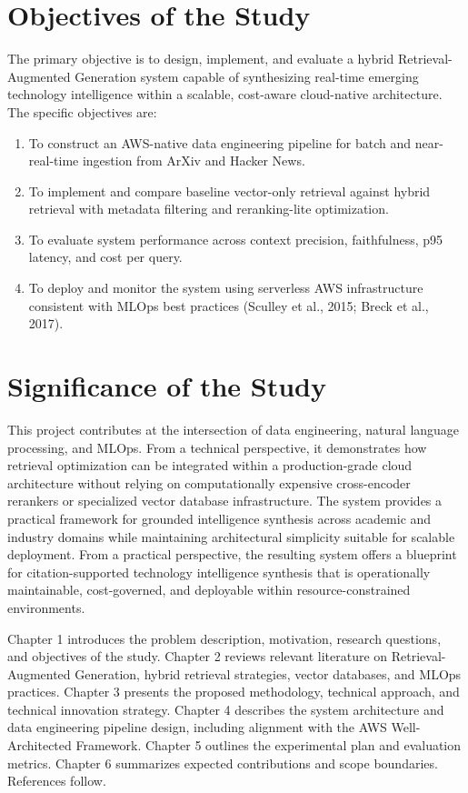 \documentclass[12pt,a4paper]{report}
\begin{document}
\section{Objectives of the Study}
\label{sec:objectives}

The primary objective is to design, implement, and evaluate a hybrid Retrieval-Augmented Generation system capable of synthesizing real-time emerging technology intelligence within a scalable, cost-aware cloud-native architecture. The specific objectives are:

\begin{enumerate}[leftmargin=0.5in]
  \item To construct an AWS-native data engineering pipeline for batch and near-real-time ingestion from ArXiv and Hacker News.
  \item To implement and compare baseline vector-only retrieval against hybrid retrieval with metadata filtering and reranking-lite optimization.
  \item To evaluate system performance across context precision, faithfulness, p95 latency, and cost per query.
  \item To deploy and monitor the system using serverless AWS infrastructure consistent with MLOps best practices (Sculley et al., 2015; Breck et al., 2017).
\end{enumerate}

\section{Significance of the Study}
\label{sec:significance}

This project contributes at the intersection of data engineering, natural language processing, and MLOps. From a technical perspective, it demonstrates how retrieval optimization can be integrated within a production-grade cloud architecture without relying on computationally expensive cross-encoder rerankers or specialized vector database infrastructure. The system provides a practical framework for grounded intelligence synthesis across academic and industry domains while maintaining architectural simplicity suitable for scalable deployment. From a practical perspective, the resulting system offers a blueprint for citation-supported technology intelligence synthesis that is operationally maintainable, cost-governed, and deployable within resource-constrained environments.


Chapter 1 introduces the problem description, motivation, research questions, and objectives of the study. Chapter 2 reviews relevant literature on Retrieval-Augmented Generation, hybrid retrieval strategies, vector databases, and MLOps practices. Chapter 3 presents the proposed methodology, technical approach, and technical innovation strategy. Chapter 4 describes the system architecture and data engineering pipeline design, including alignment with the AWS Well-Architected Framework. Chapter 5 outlines the experimental plan and evaluation metrics. Chapter 6 summarizes expected contributions and scope boundaries. References follow.
\end{document}
